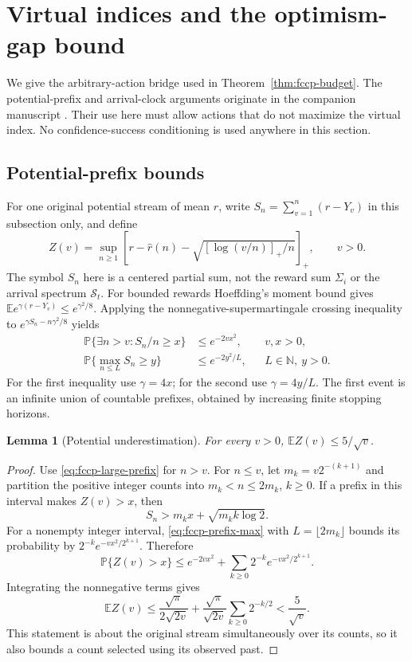\documentclass[11pt]{article}
\newtheorem{lemma}[theorem]{Lemma}
\theoremstyle{remark}
\newcommand{\E}{\mathbb E}
\newcommand{\Prob}{\mathbb P}
\begin{document}
\section{Virtual indices and the optimism-gap bound}\label{app:optimism-gap}
We give the arbitrary-action bridge used in
Theorem~\ref{thm:fccp-budget}. The potential-prefix and arrival-clock
arguments originate in the companion manuscript
\citet{temporalgeometry2026}. Their use here must allow actions that do
not maximize the virtual index. No confidence-success conditioning is
used anywhere in this section.

\subsection{Potential-prefix bounds}
For one original potential stream of mean $r$, write
$S_n=\sum_{v=1}^n(r-Y_v)$ in this subsection only, and define
\[
 Z(v)=\sup_{n\ge1}\left[r-\hat r(n)-
                \sqrt{[\log(v/n)]_+/n}\right]_+,
 \qquad v>0.
\]
The symbol $S_n$ here is a centered partial sum, not the reward sum
$\Sigma_i$ or the arrival spectrum $\mathcal S_t$.
For bounded rewards Hoeffding's moment bound gives
$\E e^{\gamma(r-Y_v)}\le e^{\gamma^2/8}$.
Applying the nonnegative-supermartingale crossing inequality to
$e^{\gamma S_n-n\gamma^2/8}$ yields
\begin{align}
 \Prob\{\exists n>v:S_n/n\ge x\}&\le e^{-2vx^2},
       &&v,x>0,\label{eq:fccp-large-prefix}\\
 \Prob\{\max_{n\le L}S_n\ge y\}&\le e^{-2y^2/L},
       &&L\in\mathbb N,\ y>0.\label{eq:fccp-prefix-max}
\end{align}
For the first inequality use $\gamma=4x$; for the second use
$\gamma=4y/L$. The first event is an infinite union of countable
prefixes, obtained by increasing finite stopping horizons.

\begin{lemma}[Potential underestimation]\label{lem:fccp-Z}
For every $v>0$, $\E Z(v)\le5/\sqrt v$.
\end{lemma}
\begin{proof}
Use \eqref{eq:fccp-large-prefix} for $n>v$. For $n\le v$, let
$m_k=v2^{-(k+1)}$ and partition the positive integer counts into
$m_k<n\le2m_k$, $k\ge0$. If a prefix in this interval makes
$Z(v)>x$, then
\[
 S_n>m_kx+\sqrt{m_kk\log2}.
\]
For a nonempty integer interval,
\eqref{eq:fccp-prefix-max} with $L=\lfloor2m_k\rfloor$ bounds its
probability by $2^{-k}e^{-vx^2/2^{k+1}}$. Therefore
\[
 \Prob\{Z(v)>x\}\le e^{-2vx^2}
             +\sum_{k\ge0}2^{-k}e^{-vx^2/2^{k+1}}.
\]
Integrating the nonnegative terms gives
\[
 \E Z(v)\le\frac{\sqrt\pi}{2\sqrt{2v}}+
     \frac{\sqrt\pi}{\sqrt{2v}}\sum_{k\ge0}2^{-k/2}
       <\frac5{\sqrt v}.
\]
This statement is about the original stream simultaneously over its
counts, so it also bounds a count selected using its observed past.
\end{proof}
\end{document}
